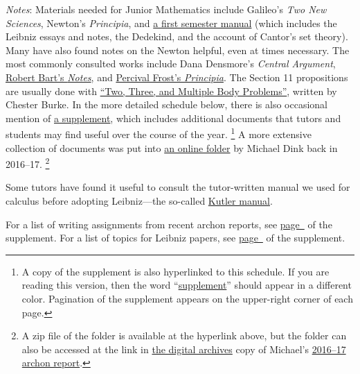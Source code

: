\documentclass[10pt]{article}
\begin{document}
{\small \emph{Notes}: Materials needed for Junior Mathematics 
include Galileo's \emph{Two New Sciences}, Newton's \emph{Principia}, and
\href{https://drive.google.com/file/d/1VxPc8zGBU1mbrk2H7robq7MhuOLA2Uer/view?usp=sharing}%
{a first semester manual} (which includes the Leibniz essays and notes,
the Dedekind, and the account of Cantor's set theory).  
Many have also found notes on the Newton helpful, even at times necessary.  
The most commonly consulted works include Dana Densmore's \emph{Central Argument},
\href{https://drive.google.com/file/d/0BwccG5Ei3816aUtwck5GTUVRWkk/view?usp=sharing&resourcekey=0-cBADjGVmJB56z9dEUeXa1g}{Robert
Bart's \emph{Notes}}, and
\href{https://drive.google.com/file/d/0BwccG5Ei3816cHlRaktYaTJRM0E/view?usp=sharing&resourcekey=0-99oCYjedTcfUM9ASSCPyXQ}%
{Percival Frost's \emph{Principia}}. 
The Section 11 propositions are usually done with
\href{https://drive.google.com/file/d/1c0gRZDPmndb5C2JiWYSOIiMQD-mNR2cD/view?usp=sharing}%
{``Two, Three, and Multiple Body Problems''}, written by Chester Burke.
In the more detailed schedule below, there is also occasional mention of
\href{https://drive.google.com/file/d/1PP99RsI_xEZ8rkgXSOlNBS2Wuk_CJkvN/view?usp=sharing}%
{a supplement}, which includes additional documents
that tutors and students may find useful over the course of the year.%
\footnote{A copy of the supplement is also hyperlinked to this schedule. 
If you are reading this version, then the word ``\hyperref[supple.1]{supplement}''
should appear in a different color. Pagination of the supplement appears on the upper-right
corner of each page.}
A more extensive collection of documents was put into
\href{https://drive.google.com/file/d/1iZOownvFcTZxxFA6KRutjVLpIjE74503/view?usp=sharing}%
{an online folder} by Michael Dink back in 2016--17.%
\footnote{A zip file of the folder is available at the hyperlink above,
but the folder can also be accessed at the link 
in \href{http://digitalarchives.sjc.edu/faculty}{the digital archives} copy
of Michael's \href{https://digitalarchives.sjc.edu/items/show/2677}{2016--17 archon report}.}

Some tutors have found it useful to consult the tutor-written manual we used for calculus before adopting Leibniz---the so-called \href{https://drive.google.com/file/d/15Eaxua300SdHRIPZwpTj6f9-6sOnjunB/view?usp=sharing}{Kutler manual}. 

For a list of writing assignments from recent archon reports, see \hyperref[supple.106]{page~\pageref{supple.106}} of the supplement. For a list of topics for Leibniz papers, see
\hyperref[supple.58]{page~\pageref{supple.58}} of the supplement.

}
\end{document}
